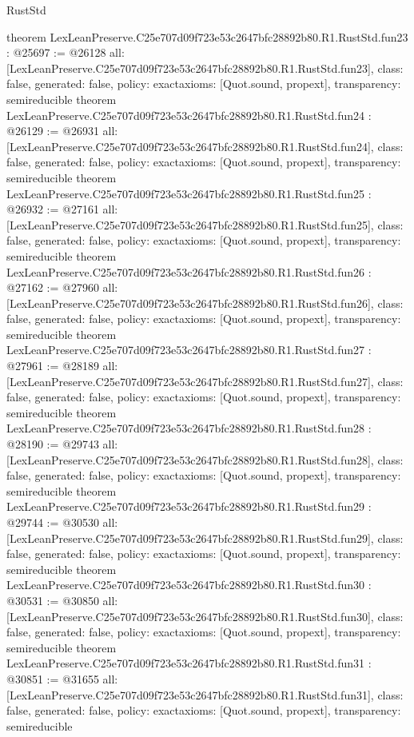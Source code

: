 \begin{lexlean}{RustStd}
\begin{coremodule}
{}
theorem LexLeanPreserve.C25e707d09f723e53c2647bfc28892b80.R1.RustStd.fun23 : @25697 := @26128 {
  all: [LexLeanPreserve.C25e707d09f723e53c2647bfc28892b80.R1.RustStd.fun23],
  class: false,
  generated: false,
  policy: exact{axioms: [Quot.sound, propext]},
  transparency: semireducible
}
theorem LexLeanPreserve.C25e707d09f723e53c2647bfc28892b80.R1.RustStd.fun24 : @26129 := @26931 {
  all: [LexLeanPreserve.C25e707d09f723e53c2647bfc28892b80.R1.RustStd.fun24],
  class: false,
  generated: false,
  policy: exact{axioms: [Quot.sound, propext]},
  transparency: semireducible
}
theorem LexLeanPreserve.C25e707d09f723e53c2647bfc28892b80.R1.RustStd.fun25 : @26932 := @27161 {
  all: [LexLeanPreserve.C25e707d09f723e53c2647bfc28892b80.R1.RustStd.fun25],
  class: false,
  generated: false,
  policy: exact{axioms: [Quot.sound, propext]},
  transparency: semireducible
}
theorem LexLeanPreserve.C25e707d09f723e53c2647bfc28892b80.R1.RustStd.fun26 : @27162 := @27960 {
  all: [LexLeanPreserve.C25e707d09f723e53c2647bfc28892b80.R1.RustStd.fun26],
  class: false,
  generated: false,
  policy: exact{axioms: [Quot.sound, propext]},
  transparency: semireducible
}
theorem LexLeanPreserve.C25e707d09f723e53c2647bfc28892b80.R1.RustStd.fun27 : @27961 := @28189 {
  all: [LexLeanPreserve.C25e707d09f723e53c2647bfc28892b80.R1.RustStd.fun27],
  class: false,
  generated: false,
  policy: exact{axioms: [Quot.sound, propext]},
  transparency: semireducible
}
theorem LexLeanPreserve.C25e707d09f723e53c2647bfc28892b80.R1.RustStd.fun28 : @28190 := @29743 {
  all: [LexLeanPreserve.C25e707d09f723e53c2647bfc28892b80.R1.RustStd.fun28],
  class: false,
  generated: false,
  policy: exact{axioms: [Quot.sound, propext]},
  transparency: semireducible
}
theorem LexLeanPreserve.C25e707d09f723e53c2647bfc28892b80.R1.RustStd.fun29 : @29744 := @30530 {
  all: [LexLeanPreserve.C25e707d09f723e53c2647bfc28892b80.R1.RustStd.fun29],
  class: false,
  generated: false,
  policy: exact{axioms: [Quot.sound, propext]},
  transparency: semireducible
}
theorem LexLeanPreserve.C25e707d09f723e53c2647bfc28892b80.R1.RustStd.fun30 : @30531 := @30850 {
  all: [LexLeanPreserve.C25e707d09f723e53c2647bfc28892b80.R1.RustStd.fun30],
  class: false,
  generated: false,
  policy: exact{axioms: [Quot.sound, propext]},
  transparency: semireducible
}
theorem LexLeanPreserve.C25e707d09f723e53c2647bfc28892b80.R1.RustStd.fun31 : @30851 := @31655 {
  all: [LexLeanPreserve.C25e707d09f723e53c2647bfc28892b80.R1.RustStd.fun31],
  class: false,
  generated: false,
  policy: exact{axioms: [Quot.sound, propext]},
  transparency: semireducible
}
\end{coremodule}
\end{lexlean}
